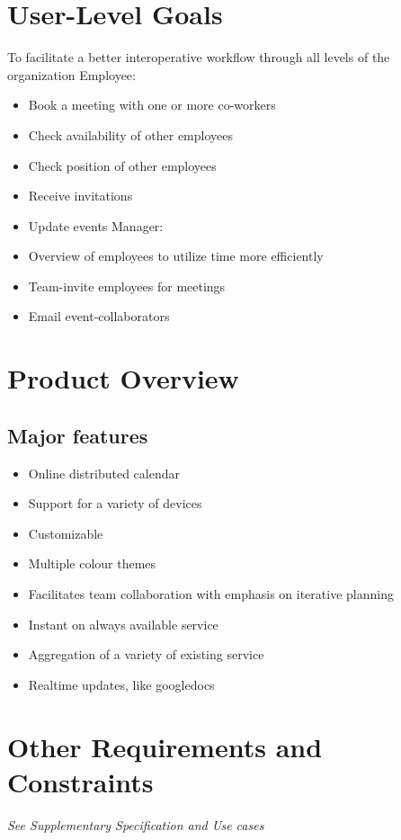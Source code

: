 \documentclass[10pt]{article}
\begin{document}
\section{User-Level Goals}
To facilitate a better interoperative workflow through all levels of the organization Employee:
\begin{itemize}

\item Book a meeting with one or more co-workers
\item Check availability of other employees
\item Check position of other employees
\item Receive invitations
\item Update events Manager:
\item Overview of employees to utilize time more efficiently
\item Team-invite employees for meetings
\item Email event-collaborators

\end{itemize}

\section{Product Overview}

\subsection{Major features}

\begin{itemize}

\item Online distributed calendar
\item Support for a variety of devices
\item Customizable
\item Multiple colour themes
\item Facilitates team collaboration with emphasis on iterative planning
\item Instant on always available service
\item Aggregation of a variety of existing service
\item Realtime updates, like googledocs

\end{itemize}

\section{Other Requirements and Constraints}
\textit{See Supplementary Specification and Use cases}
\end{document}
